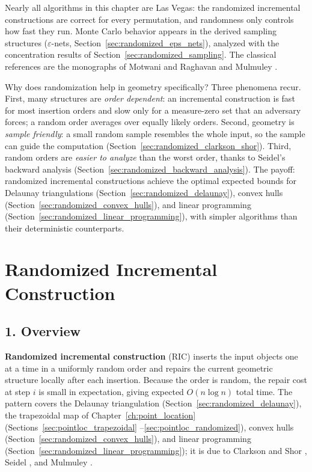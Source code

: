 Nearly all algorithms in this chapter are Las Vegas: the randomized incremental
constructions are correct for every permutation, and randomness only controls
how fast they run. Monte Carlo behavior appears in the derived sampling
structures ($\varepsilon$-nets, Section~\ref{sec:randomized_eps_nets}),
analyzed with the concentration results of Section~\ref{sec:randomized_sampling}.
The classical references are the monographs of Motwani and Raghavan
\cite{motwani1995} and Mulmuley \cite{mulmuley1994}.

Why does randomization help in geometry specifically? Three phenomena recur.
First, many structures are \emph{order dependent}: an incremental construction
is fast for most insertion orders and slow only for a measure-zero set that an
adversary forces; a random order averages over equally likely orders. Second,
geometry is \emph{sample friendly}: a small random sample resembles the whole
input, so the sample can guide the computation (Section~\ref{sec:randomized_clarkson_shor}).
Third, random orders are \emph{easier to analyze} than the worst order, thanks
to Seidel's backward analysis (Section~\ref{sec:randomized_backward_analysis}).
The payoff: randomized incremental constructions achieve the optimal expected
bounds for Delaunay triangulations (Section~\ref{sec:randomized_delaunay}),
convex hulls (Section~\ref{sec:randomized_convex_hulls}), and linear
programming (Section~\ref{sec:randomized_linear_programming}), with simpler
algorithms than their deterministic counterparts.


\section{Randomized Incremental Construction}
\label{sec:randomized_incremental}

\subsection{1. Overview}

\textbf{Randomized incremental construction} (RIC) inserts the input objects one at a time in a uniformly
random order and repairs the current geometric structure locally after each
insertion. Because the order is random, the repair cost at step $i$ is small in
expectation, giving expected $O(n \log n)$ total time. The pattern covers the
Delaunay triangulation (Section~\ref{sec:randomized_delaunay}), the trapezoidal
map of Chapter~\ref{ch:point_location} (Sections~\ref{sec:pointloc_trapezoidal}
--\ref{sec:pointloc_randomized}), convex hulls
(Section~\ref{sec:randomized_convex_hulls}), and linear programming
(Section~\ref{sec:randomized_linear_programming}); it is due to Clarkson and
Shor \cite{clarkson1989}, Seidel \cite{seidel1993}, and Mulmuley
\cite{mulmuley1994}.

